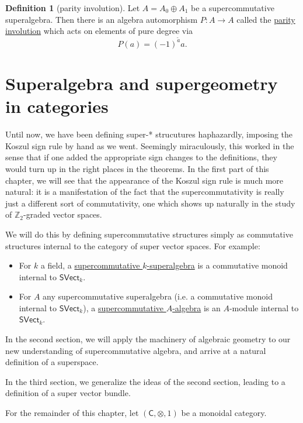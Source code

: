 \documentclass[a4paper]{report}
\newcommand{\Z}{\mathbb{Z}}
\newcommand{\defn}[1]{\ul{#1}}
\theoremstyle{definition}
\newtheorem{definition}{Definition}[section]
\theoremstyle{plain}
\theoremstyle{remark}
\begin{document}
\begin{definition}[parity involution]
  \label{def:parityinvolution}
  Let $A = A_{0} \oplus A_{1}$ be a supercommutative superalgebra. Then there is an algebra automorphism $P\colon A\to A$ called the \defn{parity involution} which acts on elements of pure degree via
  \begin{equation*}
    P(a) = (-1)^{\tilde{a}}a.
  \end{equation*}
\end{definition}

\chapter{Superalgebra and supergeometry in categories}
Until now, we have been defining super-* strucutures haphazardly, imposing the Koszul sign rule by hand as we went. Seemingly miraculously, this worked in the sense that if one added the appropriate sign changes to the definitions, they would turn up in the right places in the theorems. In the first part of this chapter, we will see that the appearance of the Koszul sign rule is much more natural: it is a manifestation of the fact that the supercommutativity is really just a different sort of commutativity, one which shows up naturally in the study of $\Z_{2}$-graded vector spaces.

We will do this by defining supercommutative structures simply as commutative structures internal to the category of super vector spaces. For example:
\begin{itemize}
  \item For $k$ a field, a \defn{supercommutative $k$-superalgebra} is a commutative monoid internal to $\mathsf{SVect}_{k}$.

  \item For $A$ any supercommutative superalgebra (i.e. a commutative monoid internal to $\mathsf{SVect}_{k}$), a \defn{supercommutative $A$-algebra} is an $A$-module internal to $\mathsf{SVect}_{k}$.
\end{itemize}

In the second section, we will apply the machinery of algebraic geometry to our new understanding of supercommutative algebra, and arrive at a natural definition of a superspace.

In the third section, we generalize the ideas of the second section, leading to a definition of a super vector bundle.

For the remainder of this chapter, let $(\mathsf{C}, \otimes, 1)$ be a monoidal category.
\end{document}
